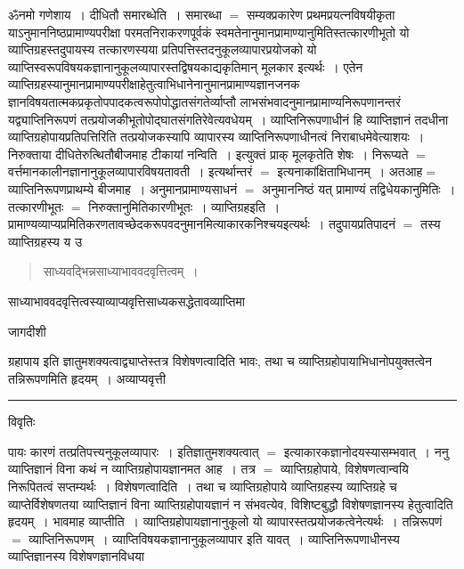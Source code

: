 \documentclass[10pt, openany]{book}
\begin{document}
{ॐनमो गणेशाय~। दीधितौ  समारब्धेति~। समारब्धा $=$ सम्यक्प्रकारेण प्रथमप्रयत्नविषयीकृता याऽनुमाननिष्ठप्रामाण्यपरीक्षा परमतनिराकरणपूर्वकं
स्वमतेनानुमानप्रामाण्यानुमितिस्तत्कारणीभूतो यो व्याप्तिग्रहस्तदुपायस्य तत्कारणस्यया प्रतिपत्तिस्तदनुकूलव्यापारप्रयोजको यो व्याप्तिस्वरूपविषयकज्ञानानुकूलव्यापारस्तद्विषयकाद्यकृतिमान् मूलकार इत्यर्थः~। एतेन व्याप्तिग्रहस्यानुमानप्रामाण्यपरीक्षाहेतुत्वाभिधानेनानुमानप्रामाण्यज्ञानजनक ज्ञानविषयतात्मकप्रकृतोपपादकत्वरूपोपोद्धातसंगतेर्व्याप्तौ  लाभसंभवादनुमानप्रामाण्यनिरूपणानन्तरं यद्व्याप्तिनिरूपणं तत्प्रयोजकीभूतोपोद्घातसंगतिरेवेत्यवधेयम्~। व्याप्तिनिरूपणाधीनं हि व्याप्तिज्ञानं तदधीना  व्याप्तिग्रहोपायप्रतिपत्तिरिति तत्प्रयोजकस्यापि व्यापारस्य व्याप्तिनिरूपणाधीनत्वं निराबाधमेवेत्याशयः~। निरुक्ताया दीधितेरुत्थितौबीजमाह टीकायां {\la नन्विति~।} इत्युक्तं प्राक् मूलकृतेति शेषः~। निरूप्यते $=$ वर्त्तमानकालीनज्ञानानुकूलव्यापारविषयतावती~। इत्यर्थान्तरं $=$ इत्यनाकांक्षिताभिधानम्~। अतआह\textendash  $=$ व्याप्तिनिरूपणप्राथम्ये बीजमाह~। अनुमानप्रामाण्यसाधनं $=$ अनुमाननिष्ठं यत् प्रामाण्यं तद्विधेयकानुमितिः~। तत्कारणीभूतः $=$ निरुक्तानुमितिकारणीभूतः~। व्याप्तिग्रहइति~। प्रामाण्यव्याप्यप्रमितिकरणतावच्छेदकरूपवदनुमानमित्याकारकनिश्चयइत्यर्थः~। तदुपायप्रतिपादनं $=$ तस्य व्याप्तिग्रहस्य य उ
\newpage
\lfoot{}
\begin{quote}
\vpc
साध्यवद्भिन्नसाध्याभाववदवृत्तित्वम्~। 
\end{quote}
{\la साध्याभाववदवृत्तित्वस्याव्याप्यवृत्तिसाध्यकसद्धेतावव्याप्तिमा}
\begin{center} जागदीशी \end{center}
{\qt ग्रहापाय} इति ज्ञातुमशक्यत्वाद्व्याप्तेस्तत्र विशेषणत्वादिति भावः, तथा च व्याप्तिग्रहोपायाभिधानोपयुक्तत्वेन तन्निरूपणमिति हृदयम्~। अव्याप्यवृत्ती\\
\hrule
 \begin{center}     विवृतिः \end{center}
पायः कारणं तत्प्रतिपत्त्यनुकूलव्यापारः~। इतिज्ञातुमशक्यत्वात् $=$ इत्याकारकज्ञानोदयस्यासम्भवात्~। ननु व्याप्तिज्ञानं विना कथं न व्याप्तिग्रहोपायज्ञानमत आह~। तत्र $=$ व्याप्तिग्रहोपाये, विशेषणत्वान्वयि निरूपितत्वं सप्तम्यर्थः~। विशेषणत्वादिति~। तथा च व्याप्तिग्रहोपाये व्याप्तिग्रहस्य व्याप्तिग्रहे च व्याप्तेर्विशेषणतया व्याप्तिज्ञानं विना व्याप्तिग्रहोपायज्ञानं न संभवत्येव, विशिष्टबुद्धौ विशेषणज्ञानस्य हेतुत्वादिति हृदयम्~। भावमाह  व्याप्तीति~। व्याप्तिग्रहोपायज्ञानानुकूलो यो व्यापारस्तत्प्रयोजकत्वेनेत्यर्थः~। तन्निरूपणं $=$ व्याप्तिनिरूपणम्~। व्याप्तिविषयकज्ञानानुकूलव्यापार इति यावत्~। व्याप्तिनिरूपणाधीनस्य व्याप्तिज्ञानस्य विशेषणज्ञानविधया
}
\end{document}

